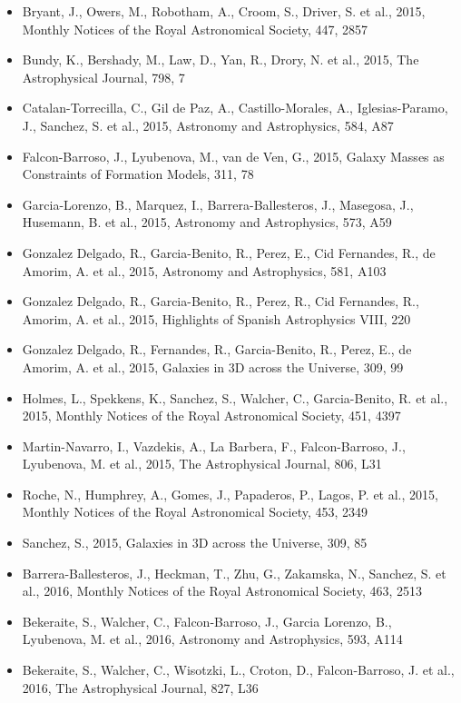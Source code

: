 \documentclass{letter}
\begin{document}
\begin{enumerate}
\begin{itemize}
\item Bryant, J., Owers, M., Robotham, A., Croom, S., Driver, S. et al., 2015, Monthly Notices of the Royal Astronomical Society, 447, 2857
\item Bundy, K., Bershady, M., Law, D., Yan, R., Drory, N. et al., 2015, The Astrophysical Journal, 798, 7
\item Catalan-Torrecilla, C., Gil de Paz, A., Castillo-Morales, A., Iglesias-Paramo, J., Sanchez, S. et al., 2015, Astronomy and Astrophysics, 584, A87
\item Falcon-Barroso, J., Lyubenova, M., van de Ven, G., 2015, Galaxy Masses as Constraints of Formation Models, 311, 78
\item Garcia-Lorenzo, B., Marquez, I., Barrera-Ballesteros, J., Masegosa, J., Husemann, B. et al., 2015, Astronomy and Astrophysics, 573, A59
\item Gonzalez Delgado, R., Garcia-Benito, R., Perez, E., Cid Fernandes, R., de Amorim, A. et al., 2015, Astronomy and Astrophysics, 581, A103
\item Gonzalez Delgado, R., Garcia-Benito, R., Perez, R., Cid Fernandes, R., Amorim, A. et al., 2015, Highlights of Spanish Astrophysics VIII, 220
\item Gonzalez Delgado, R., Fernandes, R., Garcia-Benito, R., Perez, E., de Amorim, A. et al., 2015, Galaxies in 3D across the Universe, 309, 99
\item Holmes, L., Spekkens, K., Sanchez, S., Walcher, C., Garcia-Benito, R. et al., 2015, Monthly Notices of the Royal Astronomical Society, 451, 4397
\item Martin-Navarro, I., Vazdekis, A., La Barbera, F., Falcon-Barroso, J., Lyubenova, M. et al., 2015, The Astrophysical Journal, 806, L31
\item Roche, N., Humphrey, A., Gomes, J., Papaderos, P., Lagos, P. et al., 2015, Monthly Notices of the Royal Astronomical Society, 453, 2349
\item Sanchez, S., 2015, Galaxies in 3D across the Universe, 309, 85
\item Barrera-Ballesteros, J., Heckman, T., Zhu, G., Zakamska, N., Sanchez, S. et al., 2016, Monthly Notices of the Royal Astronomical Society, 463, 2513
\item Bekeraite, S., Walcher, C., Falcon-Barroso, J., Garcia Lorenzo, B., Lyubenova, M. et al., 2016, Astronomy and Astrophysics, 593, A114
\item Bekeraite, S., Walcher, C., Wisotzki, L., Croton, D., Falcon-Barroso, J. et al., 2016, The Astrophysical Journal, 827, L36

\end{itemize}
\end{enumerate}
\end{document}
